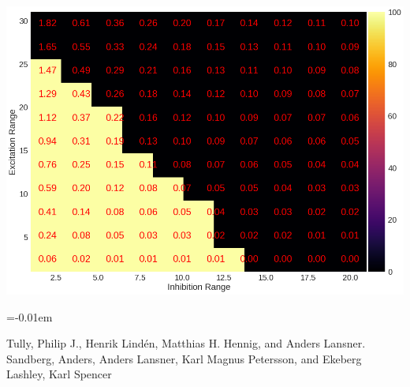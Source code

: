 \documentclass[portrait,final]{baposter}
\begin{document}
\begin{poster}
{	\begin{center}
    \includegraphics[scale=0.17]{download.png}
  	\end{center}

}

   {
    \smaller
    \vspace{-0.4em}
    
    \renewcommand{\section}[2]{\vskip 0.05em}
      \begin{thebibliography}{1}\itemsep=-0.01em
      \setlength{\baselineskip}{0.4em}
      
       Tully, Philip J., Henrik Lind\'en, Matthias H. Hennig, and Anders Lansner. 
      \vspace{5pt}
        Sandberg, Anders, Anders Lansner, Karl Magnus Petersson, and Ekeberg
      \vspace{5pt}
         Lashley, Karl Spencer
      \end{thebibliography} 
  }



\end{poster}
\end{document}
